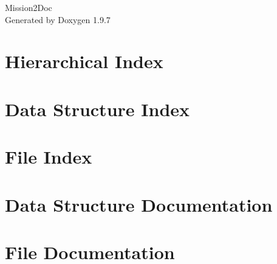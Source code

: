 \documentclass[twoside]{book}
\newcommand{\+}{\discretionary{\mbox{\scriptsize$\hookleftarrow$}}{}{}}
\newcommand{\clearemptydoublepage}{%
    \newpage{\pagestyle{empty}\cleardoublepage}%
  }
\begin{document}
  \raggedbottom
    \hypersetup{pageanchor=false,
                bookmarksnumbered=true,
                pdfencoding=unicode
               }
  \begin{titlepage}
  \vspace*{7cm}
  \begin{center}%
  {\Large Mission2\+Doc}\\
  \vspace*{1cm}
  {\large Generated by Doxygen 1.9.7}\\
  \end{center}
  \end{titlepage}
  \clearemptydoublepage
  \tableofcontents
  \clearemptydoublepage
  \hypersetup{pageanchor=true}

\chapter{Hierarchical Index}

\chapter{Data Structure Index}

\chapter{File Index}

\chapter{Data Structure Documentation}






\chapter{File Documentation}






  \backmatter
  \newpage
  \clearemptydoublepage
  \printindex
\end{document}
